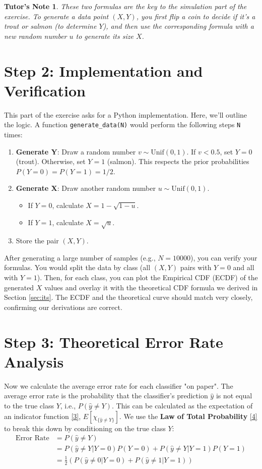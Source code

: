 \documentclass[11pt,a4paper]{article}
\newtheorem*{tutor-note}{Tutor's Note}
\begin{document}
\begin{tutor-note}
    These two formulas are the key to the simulation part of the exercise. To generate a data point $(X, Y)$, you first flip a coin to decide if it's a trout or salmon (to determine $Y$), and then use the corresponding formula with a new random number $u$ to generate its size $X$.
\end{tutor-note}

\section{Step 2: Implementation and Verification}
\label{sec:impl}
This part of the exercise asks for a Python implementation. Here, we'll outline the logic.
A function \texttt{generate\_data(N)} would perform the following steps \texttt{N} times:
\begin{enumerate}
    \item \textbf{Generate Y}: Draw a random number $v \sim \text{Unif}(0,1)$. If $v < 0.5$, set $Y=0$ (trout). Otherwise, set $Y=1$ (salmon). This respects the prior probabilities $P(Y=0)=P(Y=1)=1/2$.
    \item \textbf{Generate X}: Draw another random number $u \sim \text{Unif}(0,1)$.
    \begin{itemize}
        \item If $Y=0$, calculate $X = 1 - \sqrt{1-u}$.
        \item If $Y=1$, calculate $X = \sqrt{u}$.
    \end{itemize}
    \item Store the pair $(X, Y)$.
\end{enumerate}
After generating a large number of samples (e.g., $N=10000$), you can verify your formulas. You would split the data by class (all $(X,Y)$ pairs with $Y=0$ and all with $Y=1$). Then, for each class, you can plot the Empirical CDF (ECDF) of the generated $X$ values and overlay it with the theoretical CDF formula we derived in Section \ref{sec:its}. The ECDF and the theoretical curve should match very closely, confirming our derivations are correct.

\section{Step 3: Theoretical Error Rate Analysis}
\label{sec:error}
Now we calculate the average error rate for each classifier "on paper". The average error rate is the probability that the classifier's prediction $\hat{y}$ is not equal to the true class $Y$, i.e., $P(\hat{y} \neq Y)$. This can be calculated as the expectation of an indicator function \hyperlink{concept:lotus}{[3]}, $E[\chi_{\{\hat{y} \neq Y\}}]$. We use the \textbf{Law of Total Probability} \hyperlink{concept:tp}{[4]} to break this down by conditioning on the true class $Y$:
\begin{align*}
    \text{Error Rate} &= P(\hat{y} \neq Y) \\
    &= P(\hat{y} \neq Y | Y=0)P(Y=0) + P(\hat{y} \neq Y | Y=1)P(Y=1) \\
    &= \frac{1}{2} \left( P(\hat{y} \neq 0 | Y=0) + P(\hat{y} \neq 1 | Y=1) \right)
\end{align*}
\end{document}
